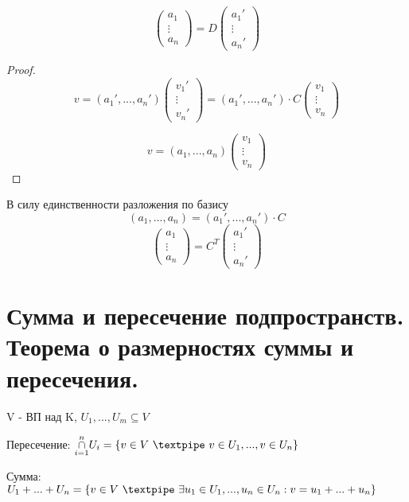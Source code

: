 \documentclass[algebra]{subfiles}
\begin{document}
      \begin{theorem} 
          \[\begin{pmatrix}
            a_1\\
            \vdots\\
            a_n
          \end{pmatrix} = D
           \begin{pmatrix}
              a_1'\\
            \vdots\\
            a_n'
           \end{pmatrix}\]
      \end{theorem}
      \begin{proof}
        \[v = (a_1', ..., a_n') \begin{pmatrix}
          v_1'\\
          \vdots\\
          v_n'
        \end{pmatrix} =
        (a_1', ..., a_n') \cdot C \begin{pmatrix}
          v_1 \\
          \vdots\\
          v_n
        \end{pmatrix} \]

        \[v = (a_1, ..., a_n) \begin{pmatrix}
          v_1\\
          \vdots\\
          v_n
        \end{pmatrix} \]
      \end{proof}
      В силу единственности разложения по базису
      \[(a_1, ..., a_n) = (a_1', ..., a_n') \cdot C  \]
      \[\begin{pmatrix}
        a_1\\
        \vdots\\
        a_n
      \end{pmatrix} = C^T
      \begin{pmatrix}
        a_1'\\
        \vdots\\
        a_n'
      \end{pmatrix}\]


  \section{Сумма и пересечение подпространств. Теорема о размерностях суммы и пересечения.}
  \begin{definition}
    V - ВП над K, \qq $U_1,...,U_m \subseteq V$

    Пересечение: $\underset{i=1}{\overset{n}{\cap}} U_i = \{ v \in V\ \textpipe\ v \in U_1,...,v \in U_n\}$

    Сумма: $U_1+...+U_n=\{v \in V\ \textpipe\ \exists u_1 \in U_1,...,u_n \in U_n: v=u_1+... + u_n \}$
  \end{definition}
\end{document}
